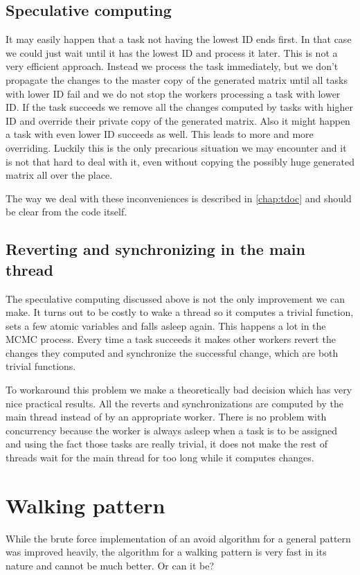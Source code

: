 \subsection{Speculative computing}
It may easily happen that a task not having the lowest ID ends first. In that case we could just wait until it has the lowest ID and process it later. This is not a very efficient approach. Instead we process the task immediately, but we don't propagate the changes to the master copy of the generated matrix until all tasks with lower ID fail and we do not stop the workers processing a task with lower ID. If the task succeeds we remove all the changes computed by tasks with higher ID and override their private copy of the generated matrix. Also it might happen a task with even lower ID succeeds as well. This leads to more and more overriding. Luckily this is the only precarious situation we may encounter and it is not that hard to deal with it, even without copying the possibly huge generated matrix all over the place.

The way we deal with these inconveniences is described in \autoref{chap:tdoc} and should be clear from the code itself.

\subsection{Reverting and synchronizing in the main thread}
The speculative computing discussed above is not the only improvement
we can make. It turns out to be costly to wake a thread so it computes a trivial function, sets a few atomic variables and falls asleep again. This happens a lot in the MCMC process. Every time a task succeeds it makes other workers revert the changes they computed and synchronize the successful change, which are both trivial functions.

To workaround this problem we make a theoretically bad decision which has very nice practical results. All the reverts and synchronizations are computed by the main thread instead of by an appropriate worker. There is no problem with concurrency because the worker is always asleep when a task is to be assigned and using the fact those tasks are really trivial, it does not make the rest of threads wait for the main thread for too long while it computes changes.

\section{Walking pattern}
While the brute force implementation of an avoid algorithm for a general pattern was improved heavily, the algorithm for a walking pattern is very fast in its nature and cannot be much better. Or can it be?

